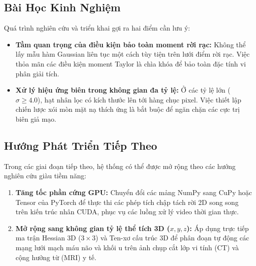 \documentclass[conference]{IEEEtran}
\begin{document}
\subsection{Bài Học Kinh Nghiệm}
Quá trình nghiên cứu và triển khai gợi ra hai điểm cần lưu ý:
\begin{itemize}
    \item \textbf{Tầm quan trọng của điều kiện bảo toàn moment rời rạc:} Không thể lấy mẫu hàm Gaussian liên tục một cách tùy tiện trên lưới điểm rời rạc. Việc thỏa mãn các điều kiện moment Taylor là chìa khóa để bảo toàn đặc tính vi phân giải tích.
    \item \textbf{Xử lý hiệu ứng biên trong không gian đa tỷ lệ:} Ở các tỷ lệ lớn ($\sigma \ge 4.0$), hạt nhân lọc có kích thước lên tới hàng chục pixel. Việc thiết lập chiến lược xói mòn mặt nạ thích ứng là bắt buộc để ngăn chặn các cực trị biên giả mạo.
\end{itemize}

\subsection{Hướng Phát Triển Tiếp Theo}
Trong các giai đoạn tiếp theo, hệ thống có thể được mở rộng theo các hướng nghiên cứu giàu tiềm năng:
\begin{enumerate}
    \item \textbf{Tăng tốc phần cứng GPU:} Chuyển đổi các mảng NumPy sang CuPy hoặc Tensor của PyTorch để thực thi các phép tích chập tách rời 2D song song trên kiến trúc nhân CUDA, phục vụ các luồng xử lý video thời gian thực.
    \item \textbf{Mở rộng sang không gian tỷ lệ thể tích 3D ($x, y, z$):} Áp dụng trực tiếp ma trận Hessian 3D ($3 \times 3$) và Ten-xơ cấu trúc 3D để phân đoạn tự động các mạng lưới mạch máu não và khối u trên ảnh chụp cắt lớp vi tính (CT) và cộng hưởng từ (MRI) y tế.
\end{enumerate}

\clearpage


\clearpage


\end{document}
